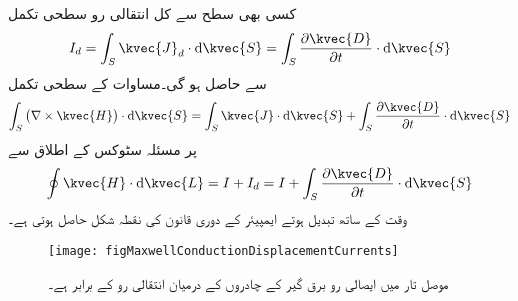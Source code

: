 کسی بھی سطح سے کل انتقالی رو سطحی تکمل
\begin{align}
I_d=\int_S \kvec{J}_d \cdot \dif \kvec{S}=\int_S \frac{\partial \kvec{D}}{\partial t} \cdot \dif \kvec{S}
\end{align}
سے حاصل ہو گی۔مساوات  کے سطحی تکمل
\begin{align*}
\int_S \left(\nabla \times \kvec{H} \right) \cdot \dif \kvec{S}=\int_S \kvec{J} \cdot \dif \kvec{S}+\int_S \frac{\partial \kvec{D}}{\partial t} \cdot \dif \kvec{S}
\end{align*}
پر مسئلہ سٹوکس کے اطلاق سے
\begin{align}
\oint \kvec{H} \cdot \dif \kvec{L}=I+I_d=I+\int_S \frac{\partial \kvec{D}}{\partial t} \cdot \dif \kvec{S}
\end{align}
 وقت کے ساتھ تبدیل ہوتے ایمپیئر کے دوری قانون کی نقطہ شکل حاصل ہوتی ہے۔

\begin{figure}
\centering
\texttt{[image: figMaxwellConductionDisplacementCurrents]}
\caption{موصل تار میں ایصالی رو برق گیر  کے چادروں کے درمیان انتقالی رو کے برابر ہے۔}
\label{شکل_میکس_ویل_ایصالی_انتقالی_رو}
\end{figure}

